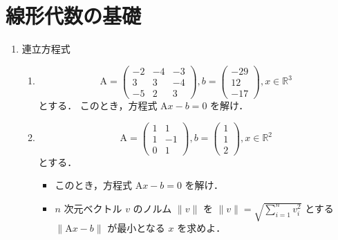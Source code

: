 \section{線形代数の基礎}

\begin{enumerate}[label=問\arabic*.]
  \vspace{2mm}
  \item 連立方程式

  \vspace{1mm}
  \begin{enumerate}[label=(\roman*)]
    \item
    \begin{equation}
      \mathrm{A} = \left(
        \begin{array}{rrr}
          -2 & -4 & -3 \\ 3 & 3 & -4 \\ -5 & 2 & 3
        \end{array} \right),
      b = \left(
        \begin{array}{r}
          -29 \\ 12 \\ -17
        \end{array}
        \right),
      x \in \mathbb{R}^3
    \end{equation}
    とする．
    このとき，方程式 $\mathrm{A}x-b=0$ を解け．
    
    \item
    \begin{equation}
      \mathrm{A} = \left(
        \begin{array}{rrr}
           1 & 1 \\ 1 & -1 \\ 0 & 1
        \end{array}
        \right),
      b=\left( \begin{array}{r} 1 \\ 1 \\ 2 \end{array} \right),
      x \in \mathbb{R}^2
    \end{equation}
    とする．
    \begin{itemize}
      \item このとき，方程式 $\mathrm{A}x-b=0$ を解け．
      \item $n$ 次元ベクトル $v$ のノルム $\|v\|$ を $\|v\| = \sqrt{\sum_{i=1}^n v_i^2}$ とする
      $\|\mathrm{A}x-b\|$ が最小となる $x$ を求めよ．
    \end{itemize}
    

\end{enumerate}
\end{enumerate}
